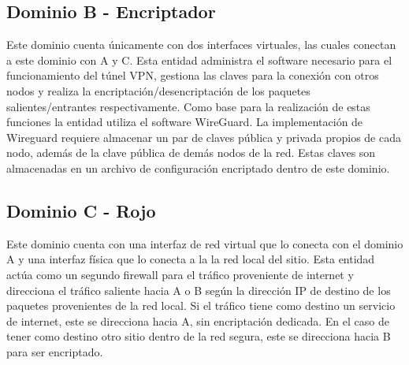 \documentclass[12pt]{article}
\begin{document}
\subsection{Dominio B - Encriptador}
Este dominio cuenta únicamente con dos interfaces virtuales, las cuales conectan a este dominio con A y C. Esta entidad administra el software necesario para el funcionamiento del túnel VPN, gestiona las claves para la conexión con otros nodos y realiza la encriptación/desencriptación de los paquetes salientes/entrantes respectivamente. Como base para la realización de estas funciones la entidad utiliza el software WireGuard.
La implementación de Wireguard requiere almacenar un par de claves pública y privada propios de cada nodo, además de la clave pública de demás nodos de la red. Estas claves son almacenadas en un archivo de configuración encriptado dentro de este dominio.

\subsection{Dominio C - Rojo}

Este dominio cuenta con una interfaz de red virtual que lo conecta con el dominio A y una interfaz física que lo conecta a la la red local del sitio. Esta entidad actúa como un segundo firewall para el tráfico proveniente de internet y direcciona el tráfico saliente hacia A o B según la dirección IP de destino de los paquetes provenientes de la red local. Si el tráfico tiene como destino un servicio de internet, este se direcciona hacia A, sin encriptación dedicada. En el caso de tener como destino otro sitio dentro de la red segura, este se direcciona hacia B para ser encriptado.
\end{document}
